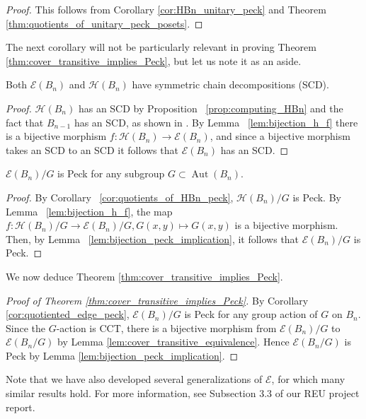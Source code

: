 \documentclass[smallextended]{svjour3}       %
\numberwithin{equation}{section}
\newcommand\Aut{\operatorname{Aut}}
\begin{document}
\begin{proof}
This follows from Corollary \ref{cor:HBn_unitary_peck} and Theorem \ref{thm:quotients_of_unitary_peck_posets}.
\end{proof}

The next corollary will not be particularly relevant in proving Theorem \ref{thm:cover_transitive_implies_Peck}, but let us note it as an aside.

\begin{corollary}
Both $\mathcal{E}(B_n)$ and $\mathcal H(B_n)$ have symmetric chain decompositions (SCD).
\end{corollary}


\begin{proof}
$\mathcal{H}(B_n)$ has an SCD by Proposition ~\ref{prop:computing_HBn} and the fact that $B_{n-1}$ has an SCD, as shown in \cite{greene}.  By Lemma ~\ref{lem:bijection_h_f} there is a bijective morphism $f\colon\mathcal{H}(B_n)\rightarrow\mathcal{E}(B_n)$, and since a bijective morphism takes an SCD to an SCD it follows that $\mathcal{E}(B_n)$ has an SCD.
\end{proof}


\begin{corollary}
\label{cor:quotiented_edge_peck}
$\mathcal E(B_n)/G$ is Peck for any subgroup $G\subset \Aut(B_n)$.
\end{corollary}
\begin{proof}
By Corollary ~\ref{cor:quotients_of_HBn_peck}, $\mathcal H(B_n)/G$ is Peck. By Lemma ~\ref{lem:bijection_h_f}, the map $f\colon\mathcal H(B_n)/G \rightarrow \mathcal E(B_n)/G,G(x, y) \mapsto G(x, y)$ is a bijective morphism. Then, by Lemma ~\ref{lem:bijection_peck_implication}, it follows that $\mathcal E(B_n)/G$ is Peck.
\end{proof}

We now deduce Theorem \ref{thm:cover_transitive_implies_Peck}.

\begin{proof}[Proof of Theorem \ref{thm:cover_transitive_implies_Peck}]
By Corollary \ref{cor:quotiented_edge_peck}, $\mathcal{E}(B_n)/G$ is Peck for any group action of $G$ on $B_n$. Since the $G$-action is CCT, there is a bijective morphism from $\mathcal{E}(B_n)/G$ to $\mathcal{E}(B_n/G)$ by Lemma \ref{lem:cover_transitive_equivalence}. Hence $\mathcal{E}(B_n/G)$ is Peck by Lemma \ref{lem:bijection_peck_implication}.
\end{proof}

Note that we have also developed several generalizations of $\mathcal E$, for which many similar results hold. For more information, see Subsection 3.3 of our REU project report.
\end{document}
